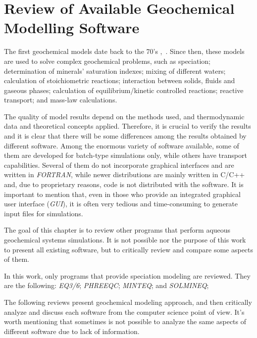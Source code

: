 

\chapter{Review of Available Geochemical Modelling Software}
\label{chapter:review}
The first geochemical models date back to the 70’s \cite{Westall:76},~\cite{Wolery:1979}. 
Since then, these models are used to solve complex geochemical problems, such as speciation; determination of minerals' saturation indexes; mixing of different waters; calculation of stoichiometric reactions; interaction between solids, fluids and gaseous phases; calculation of equilibrium/kinetic controlled reactions; reactive transport; and mass-law calculations.

The quality of model results depend on the methods used, and thermodynamic data and theoretical concepts applied. Therefore, it is crucial to verify the results and it is clear that there will be some differences among the results obtained by different software. Among the enormous variety of software available, some of them are developed for batch-type simulations only, while others have transport capabilities. Several of them do not incorporate graphical interfaces and are written in \emph{FORTRAN}, while newer distributions are mainly written in C/C++ and, due to proprietary reasons, code is not distributed with the software. It is important to mention that, even in those who provide an integrated graphical user interface (\emph{GUI}), it is often very tedious and time-consuming to generate input files for simulations.

The goal of this chapter is to review other programs that perform aqueous geochemical systems simulations. It is not possible nor the purpose of this work to present all existing software, but to critically review and compare some aspects of them. 

In this work, only programs that provide speciation modeling are reviewed. They are the following: \emph{EQ3/6}; \emph{PHREEQC}; \emph{MINTEQ}; and \emph{SOLMINEQ};

The following reviews present geochemical modeling approach, and then critically analyze and discuss each software from the computer science point of view. It's worth mentioning that sometimes is not possible to analyze the same aspects of different software due to lack of information.


